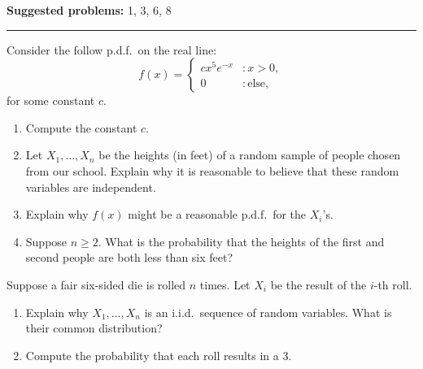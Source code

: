 \documentclass[12pt,reqno]{amsart}
\begin{document}
\textbf{Suggested problems:} 1, 3, 6, 8

\bigskip
\hrule

\bigskip
\prob Consider the follow p.d.f.\ on the real line:
\[
	f(x) = \begin{cases}
	c x^5 e^{-x} & : x > 0, \\
	0 & : \text{else},
	\end{cases}
\]
for some constant $c$.

\begin{enumerate}
\item Compute the constant $c$.\vfill
\item Let $X_1,\ldots,X_n$ be the heights (in feet) of a random sample of people chosen from our school. Explain why it is reasonable to believe that these random variables are independent.\vfill
\item Explain why $f(x)$ might be a reasonable p.d.f.\ for the $X_i$'s.\vfill
\item Suppose $n\geq 2$. What is the probability that the heights of the first and second people are both less than six feet?
\end{enumerate}

\vfill
\newpage
\prob Suppose a fair six-sided die is rolled $n$ times. Let $X_i$ be the result of the $i$-th roll. 

\begin{enumerate}
\item Explain why $X_1,\ldots,X_n$ is an i.i.d.\ sequence of random variables. What is their common distribution?\vfill
\item Compute the probability that each roll results in a $3$.\vfill
\end{enumerate}
\end{document}
